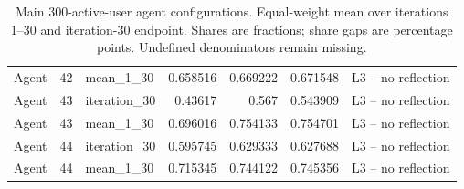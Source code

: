 \begin{table}[htbp!]
\begin{tabular}{lrlrrrl}
Agent & 42 & mean\_1\_30 & 0.658516 & 0.669222 & 0.671548 & L3 -- no reflection \\
Agent & 43 & iteration\_30 & 0.43617 & 0.567 & 0.543909 & L3 -- no reflection \\
Agent & 43 & mean\_1\_30 & 0.696016 & 0.754133 & 0.754701 & L3 -- no reflection \\
Agent & 44 & iteration\_30 & 0.595745 & 0.629333 & 0.627688 & L3 -- no reflection \\
Agent & 44 & mean\_1\_30 & 0.715345 & 0.744122 & 0.745356 & L3 -- no reflection \\
\hline
\end{tabular}
\caption{Main 300-active-user agent configurations. Equal-weight mean over iterations 1--30 and iteration-30 endpoint. Shares are fractions; share gaps are percentage points. Undefined denominators remain missing.}
\label{chap:results:tab:rq3_agents_head_outcomes}
\end{table}
